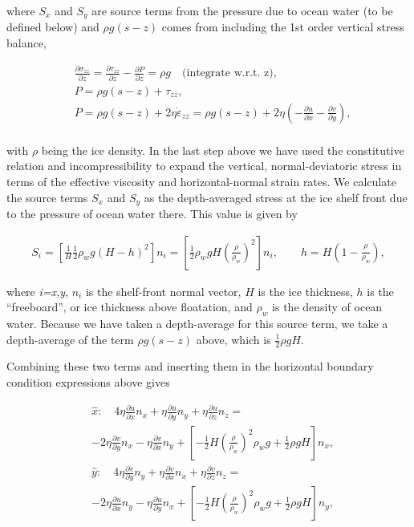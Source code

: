 where $S_x$ and $S_y$ are source terms from the pressure due to ocean water (to be defined below) and $\rho g\left( s-z \right)$ comes from including the 1st order vertical stress balance,

\begin{align*}
  & \frac{\partial \sigma _{zz}}{\partial z}=\frac{\partial \tau _{zz}}{\partial z}-\frac{\partial P}{\partial z}=\rho g\quad \text{(integrate w}\text{.r}\text{.t}\text{. z)}, \\ 
 & P=\rho g\left( s-z \right)+\tau _{zz}, \\ 
 & P=\rho g\left( s-z \right)+2\eta \dot{\varepsilon }_{zz}=\rho g\left( s-z \right)+2\eta \left( -\frac{\partial u}{\partial x}-\frac{\partial v}{\partial y} \right), \\ 
\end{align*}

with \textit{\(\rho{}\)} being the ice density. In the last step above we have used the constitutive relation and incompressibility to expand the vertical, normal-deviatoric stress in terms of the effective viscosity and horizontal-normal strain rates. We calculate the source terms $S_x$ and $S_y$ as the depth-averaged stress at the ice shelf front due to the pressure of ocean water there. This value is given by

\begin{align*}
S_{i}=\left[ \frac{1}{H}\frac{1}{2}\rho _{w}g\left( H-h \right)^{2} \right]n_{i}=\left[ \frac{1}{2}\rho _{w}gH\left( \frac{\rho }{\rho _{w}} \right)^{2} \right]n_{i},\quad \quad h=H\left( 1-\frac{\rho _{{}}}{\rho _{w}} \right),
\end{align*}

where  \textit{i=x,y}, $n_i$ is the shelf-front normal vector, $H$ is the ice thickness, $h$ is the ``freeboard'', or ice thickness above floatation, and $\rho_w$ is the density of ocean water. Because we have taken a depth-average for this source term, we take a depth-average of the term $\rho g\left( s-z \right)$ above, which is $\frac{1}{2}\rho gH$.

Combining these two terms and inserting them in the horizontal boundary condition expressions above gives

\begin{align*}
& \hat{x}:\quad 4\eta \frac{\partial u}{\partial x}n_{x}+\eta \frac{\partial u}{\partial y}n_{y}+\eta \frac{\partial u}{\partial z}n_{z}= \\
& -2\eta \frac{\partial v}{\partial y}n_{x}-\eta \frac{\partial v}{\partial x}n_{y}+\left[ -\frac{1}{2}H\left( \frac{\rho }{\rho _{w}} \right)^{2}\rho _{w}g+\frac{1}{2}\rho gH \right]n_{x}, \\ 
 & \hat{y}:\quad 4\eta \frac{\partial v}{\partial y}n_{y}+\eta \frac{\partial v}{\partial x}n_{x}+\eta \frac{\partial v}{\partial z}n_{z}= \\
 & -2\eta \frac{\partial u}{\partial x}n_{y}-\eta \frac{\partial u}{\partial y}n_{x}+\left[ -\frac{1}{2}H\left( \frac{\rho }{\rho _{w}} \right)^{2}\rho _{w}g+\frac{1}{2}\rho gH \right]n_{y}, \\ 
\end{align*}

